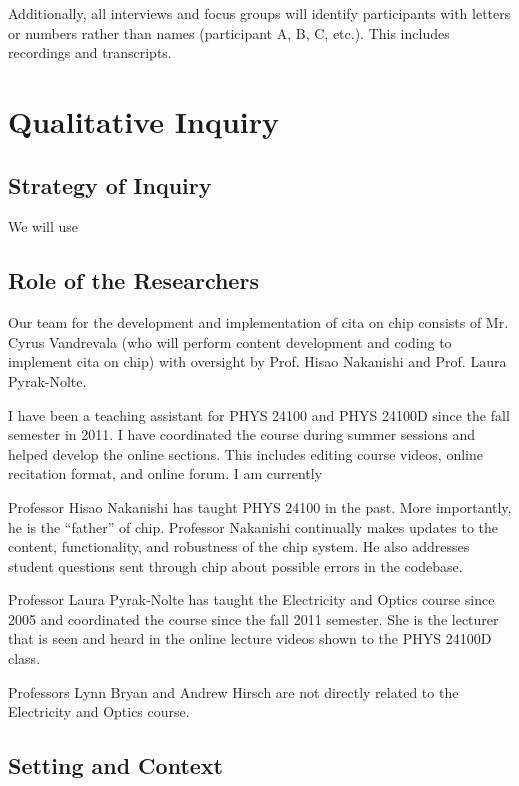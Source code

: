 Additionally, all interviews and focus groups will identify participants with letters or numbers rather than names (participant A, B, C, etc.). This includes recordings and transcripts.








\section{Qualitative Inquiry}

\subsection{Strategy of Inquiry}

We will use

\subsection{Role of the Researchers}

Our team for the development and implementation of \gls{cita} on \gls{chip} consists of Mr. Cyrus Vandrevala (who will perform content development and coding to implement \gls{cita} on \gls{chip}) with oversight by Prof. Hisao Nakanishi and Prof. Laura Pyrak-Nolte.

I have been a teaching assistant for PHYS 24100 and PHYS 24100D since the fall semester in 2011. I have coordinated the course during summer sessions and helped develop the online sections. This includes editing course videos, online recitation format, and online forum. I am currently

Professor Hisao Nakanishi has taught PHYS 24100 in the past. More importantly, he is the ``father'' of \gls{chip}. Professor Nakanishi continually makes updates to the content, functionality, and robustness of the \gls{chip} system. He also addresses student questions sent through \gls{chip} about possible errors in the codebase.

Professor Laura Pyrak-Nolte has taught the Electricity and Optics course since 2005 and coordinated the course since the fall 2011 semester. She is the lecturer that is seen and heard in the online lecture videos shown to the PHYS 24100D class.

Professors Lynn Bryan and Andrew Hirsch are not directly related to the Electricity and Optics course.

\subsection{Setting and Context}
